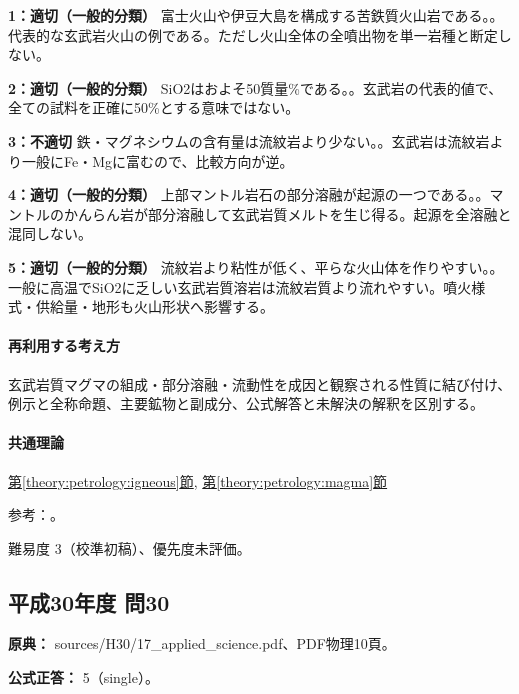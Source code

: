\noindent\textbf{1：適切（一般的分類）} 富士火山や伊豆大島を構成する苦鉄質火山岩である。。代表的な玄武岩火山の例である。ただし火山全体の全噴出物を単一岩種と断定しない。\par

\noindent\textbf{2：適切（一般的分類）} SiO2はおよそ50質量\%である。。玄武岩の代表的値で、全ての試料を正確に50\%とする意味ではない。\par

\noindent\textbf{3：不適切} 鉄・マグネシウムの含有量は流紋岩より少ない。。玄武岩は流紋岩より一般にFe・Mgに富むので、比較方向が逆。\par

\noindent\textbf{4：適切（一般的分類）} 上部マントル岩石の部分溶融が起源の一つである。。マントルのかんらん岩が部分溶融して玄武岩質メルトを生じ得る。起源を全溶融と混同しない。\par

\noindent\textbf{5：適切（一般的分類）} 流紋岩より粘性が低く、平らな火山体を作りやすい。。一般に高温でSiO2に乏しい玄武岩質溶岩は流紋岩質より流れやすい。噴火様式・供給量・地形も火山形状へ影響する。\par

\paragraph{再利用する考え方} 玄武岩質マグマの組成・部分溶融・流動性を成因と観察される性質に結び付け、例示と全称命題、主要鉱物と副成分、公式解答と未解決の解釈を区別する。

\paragraph{共通理論} \hyperref[theory:petrology:igneous]{第\ref*{theory:petrology:igneous}節}, \hyperref[theory:petrology:magma]{第\ref*{theory:petrology:magma}節}

\par 参考：\cite{jma_magma1999,gsj_igneous2021}。

\par 難易度 3（校準初稿）、優先度未評価。

\subsection{平成30年度 問30}
\label{q:h30-reg-applied-30}

\noindent\textbf{原典：} sources/H30/17\_applied\_science.pdf、PDF物理10頁。

\textbf{公式正答：} 5（single）。


